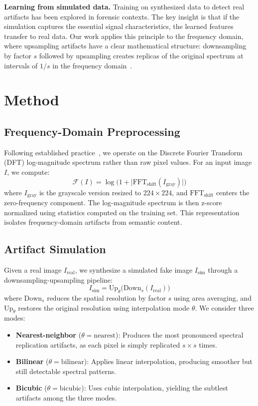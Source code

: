 \documentclass[11pt,a4paper]{article}
\begin{document}
\textbf{Learning from simulated data.}
Training on synthesized data to detect real artifacts has been explored in forensic contexts. The key insight is that if the simulation captures the essential signal characteristics, the learned features transfer to real data. Our work applies this principle to the frequency domain, where upsampling artifacts have a clear mathematical structure: downsampling by factor $s$ followed by upsampling creates replicas of the original spectrum at intervals of $1/s$ in the frequency domain~\cite{zhang2020detecting}.

\section{Method}

\subsection{Frequency-Domain Preprocessing}

Following established practice~\cite{frank2020leveraging, zhang2020detecting}, we operate on the Discrete Fourier Transform (DFT) log-magnitude spectrum rather than raw pixel values. For an input image $I$, we compute:
\begin{equation}
    \mathcal{F}(I) = \log\!\bigl(1 + \bigl|\mathrm{FFT}_{\mathrm{shift}}(I_{\mathrm{gray}})\bigr|\bigr)
\end{equation}
where $I_{\mathrm{gray}}$ is the grayscale version resized to $224 \times 224$, and $\mathrm{FFT}_{\mathrm{shift}}$ centers the zero-frequency component. The log-magnitude spectrum is then z-score normalized using statistics computed on the training set. This representation isolates frequency-domain artifacts from semantic content.

\subsection{Artifact Simulation}

Given a real image $I_{\mathrm{real}}$, we synthesize a simulated fake image $I_{\mathrm{sim}}$ through a downsampling-upsampling pipeline:
\begin{equation}
    I_{\mathrm{sim}} = \mathrm{Up}_\theta\bigl(\mathrm{Down}_s(I_{\mathrm{real}})\bigr)
\end{equation}
where $\mathrm{Down}_s$ reduces the spatial resolution by factor $s$ using area averaging, and $\mathrm{Up}_\theta$ restores the original resolution using interpolation mode $\theta$. We consider three modes:
\begin{itemize}[nosep]
    \item \textbf{Nearest-neighbor} ($\theta = \text{nearest}$): Produces the most pronounced spectral replication artifacts, as each pixel is simply replicated $s \times s$ times.
    \item \textbf{Bilinear} ($\theta = \text{bilinear}$): Applies linear interpolation, producing smoother but still detectable spectral patterns.
    \item \textbf{Bicubic} ($\theta = \text{bicubic}$): Uses cubic interpolation, yielding the subtlest artifacts among the three modes.
\end{itemize}
\end{document}
